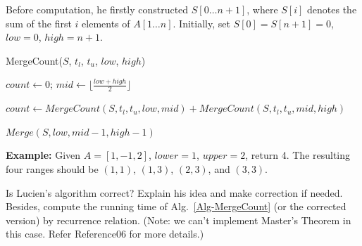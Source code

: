 \documentclass[12pt,a4paper]{article}
\theoremstyle{definition}
\begin{document}
\begin{enumerate}
    Before computation, he firstly constructed $S[0 \ldots n+1]$, where $S[i]$ denotes the sum of the first $i$ elements of $A[1 \ldots n]$. Initially, set $S[0]=S[n+1]=0$, $low=0$, $high=n+1$.

\begin{minipage}[t]{0.90\textwidth}
	\begin{algorithm}[H]
		\BlankLine
		\caption{MergeCount($S$, $t_l$, $t_u$, $low$, $high$)}
		\label{Alg-MergeCount}
		
		$count \leftarrow 0$; $mid\leftarrow \lfloor \frac{low+high}{2} \rfloor$\;
		
		
		$count\leftarrow MergeCount(S, t_l, t_u, low, mid)+ MergeCount(S, t_l, t_u, mid, high)$\;
		
		$Merge(S,low,mid-1,high-1)$  
		
		\;
		
	\end{algorithm}
\end{minipage}

    {\color{purple}\textbf{Example:} Given $A = [1,-1,2]$, $lower = 1$, $upper = 2$, return 4. The resulting four ranges should be $(1,1)$, $(1,3)$, $(2,3)$, and $(3,3)$.}

    Is Lucien's algorithm correct? Explain his idea and make correction if needed. Besides, compute the running time of Alg.~\ref{Alg-MergeCount} (or the corrected version) by recurrence relation. {\color{blue}(Note: we can't implement Master's Theorem in this case. Refer Reference06 for more details.)}
   

\end{enumerate}
\end{document}
